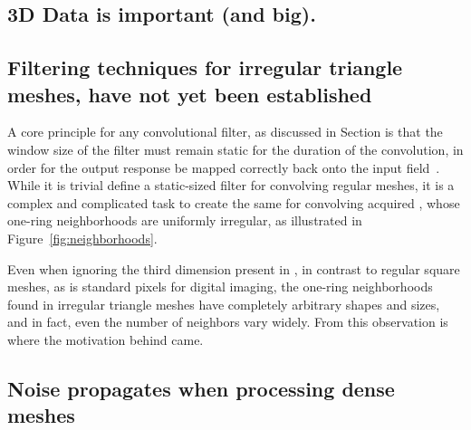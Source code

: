 %
%
%
%
\subsection{3D Data is important (and big).}

%
%
%
%
\subsection{Filtering techniques for irregular triangle meshes, have not yet been established}



A core principle for any convolutional filter, as discussed in Section is that the  window size of the filter must remain static for the duration of the convolution, in order for the output response be mapped correctly back onto the input field~\cite[p.~106-112]{Jaehne97}. While it is trivial define a static-sized filter for convolving regular meshes, it is a complex and complicated task to create the same for convolving acquired \tdd{}, whose one-ring neighborhoods are uniformly irregular, as illustrated in Figure~\ref{fig:neighborhoods}.

Even when ignoring the third dimension present in \tdd{}, in contrast to regular square meshes, as is standard pixels for digital imaging, the one-ring neighborhoods found in irregular triangle meshes have completely arbitrary shapes and sizes, and in fact, even the number of neighbors vary widely. From this observation is where the motivation behind  came.
%
\subsection{Noise propagates when processing dense meshes}

%

